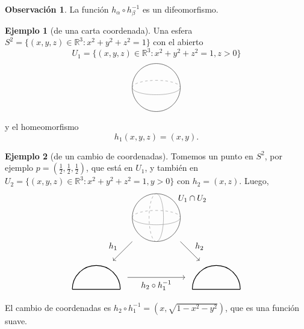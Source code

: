 \documentclass[spanish]{book}
\theoremstyle{definition}
\newtheorem*{obs}{Observación}
\newtheorem*{ejem}{Ejemplo}
\newcommand{\R}{\mathbb{R}}
\begin{document}
	\begin{obs}
		La función $h_\alpha\circ h_\beta^{-1}$ es un difeomorfismo.
	\end{obs}
	\begin{ejem}[de una carta coordenada]
		Una esfera $S^2=\{(x,y,z)\in\R^3:x^2+y^2+z^2=1\}$ con el abierto
		\[U_1=\{(x,y,z)\in\R^3: x^2+y^2+z^2=1, z>0\}\]
		\[\begin{tikzpicture}
			\draw (0,0) circle (1);
			\draw[gray] (-1,0) arc (180:360:1 and 0.3);
			\draw[gray,dashed] (-1,0) arc (180:0:1 and 0.3);
		\end{tikzpicture}\]
		y el homeomorfismo
		\[h_1(x,y,z)=(x,y).\]
	\end{ejem}
	\begin{ejem}[de un cambio de coordenadas]
		Tomemos un punto en $S^2$, por ejemplo $p=(\frac{1}{2},\frac{1}{2},\frac{1}{2})$, que está en $U_1$, y también en $U_2=\{(x,y,z)\in\R^3: x^2+y^2+z^2=1, y>0\}$ con $h_2=(x,z)$. Luego,
		\[\begin{tikzpicture}
			\draw (0,0) circle (1);
			\draw[gray] (-1,0) arc (180:360:1 and 0.3);
			\draw[gray,dashed] (-1,0) arc (180:0:1 and 0.3);
			\draw[gray,dashed] (0,-1) arc (270:90:0.3 and 1);
			\draw[gray] (0,1) arc (90:-90:0.3 and 1);
			\node at (1.5,0.8) {$U_1\cap U_2$};
			
			\draw[->] (-1,-1) -- (-1.8,-1.8);
			\node at (-1.8,-1.2) {$h_1$};
			\draw[->] (1,-1) -- (1.8,-1.8);
			\node at (1.8,-1.2) {$h_2$};
			\draw[->] (-1.2,-2.5) -- (1.2,-2.5) node[midway,below] {$h_2\circ h_1^{-1}$};
			
			\draw[thick] (-1.5,-3) arc (0:180:1);
			\draw[thick] (-1.5,-3) -- (-3.5,-3);
			
			\draw[thick] (1.5,-3) arc (180:0:1);
			\draw[thick] (1.5,-3) -- (3.5,-3);
		\end{tikzpicture}\]
		El cambio de coordenadas es $h_2\circ h_1^{-1}=(x,\sqrt{1-x^2-y^2})$, que es una función suave.
	\end{ejem}
\end{document}
